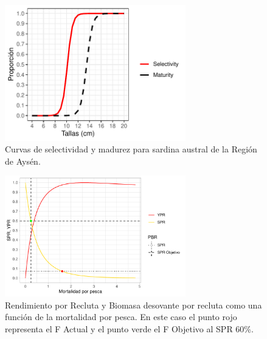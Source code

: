 \documentclass[
  spanish,
]{article}
\begin{document}
\begin{figure}[h!]
\centering
\includegraphics[width=0.7\textwidth]{LBPA/Figuras/selectividad_talla-1.pdf}
\caption{Curvas de selectividad y madurez para sardina austral de la Región de Aysén.}
\label{Fig24}
\end{figure}

\pagebreak

\begin{figure}[h!]
\centering
\includegraphics[width=0.7\textwidth]{LBPA/Figuras/CurvaSPR-1.pdf}
\caption{Rendimiento por Recluta y Biomasa desovante por recluta como una función de la mortalidad por pesca. En este caso el punto rojo representa el F Actual  y el punto verde el F Objetivo al SPR 60\%.}
\label{Fig25}
\end{figure}
\end{document}
